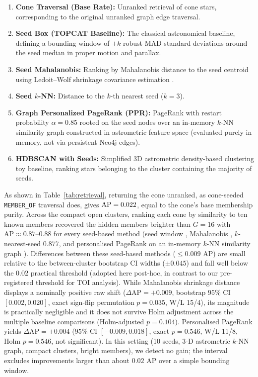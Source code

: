 \documentclass[preprint,12pt,authoryear]{elsarticle}
\begin{document}
\begin{enumerate}
    \item \textbf{Cone Traversal (Base Rate):} Unranked retrieval of cone stars, corresponding to the original unranked graph edge traversal.
    \item \textbf{Seed Box (TOPCAT Baseline):} The classical astronomical baseline, defining a bounding window of $\pm k$ robust MAD standard deviations around the seed median in proper motion and parallax.
    \item \textbf{Seed Mahalanobis:} Ranking by Mahalanobis distance to the seed centroid using Ledoit--Wolf shrinkage covariance estimation \citep{Ledoit2004}.
    \item \textbf{Seed $k$-NN:} Distance to the $k$-th nearest seed ($k=3$).
    \item \textbf{Graph Personalized PageRank (PPR):} PageRank with restart probability $\alpha = 0.85$ rooted on the seed nodes over an in-memory $k$-NN similarity graph constructed in astrometric feature space (evaluated purely in memory, not via persistent Neo4j edges).
    \item \textbf{HDBSCAN with Seeds:} Simplified 3D astrometric density-based clustering toy baseline, ranking stars belonging to the cluster containing the majority of seeds.
\end{enumerate}



As shown in Table~\ref{tab:retrieval}, returning the cone unranked, as cone-seeded \texttt{MEMBER\_OF} traversal does, gives $\text{AP} = 0.022{}$, equal to the cone's base membership purity. Across the \nRetrClusters{} compact open clusters, ranking each cone by similarity to ten known members recovered the hidden members brighter than $G = 16$ with $\text{AP} \approx 0.87$--$0.88$ for every seed-based method (seed window \seedBoxAP{}, Mahalanobis \seedMahalanobisAP{}, $k$-nearest-seed $0.877$, and personalised PageRank on an in-memory $k$-NN similarity graph \graphPPRAP{}). Differences between these seed-based methods ($\le 0.009$ AP) are small relative to the between-cluster bootstrap CI widths ($\pm 0.045$) and fall well below the $0.02$ practical threshold (adopted here post-hoc, in contrast to our pre-registered threshold for TOI analysis). While Mahalanobis shrinkage distance displays a nominally positive raw shift ($\Delta\text{AP} = +0.009$, bootstrap $95\%$ CI $[0.002, 0.020]$, exact sign-flip permutation $p = 0.035$, W/L 15/4), its magnitude is practically negligible and it does not survive Holm adjustment across the multiple baseline comparisons (Holm-adjusted $p = 0.104$). Personalised PageRank yields $\Delta\text{AP} = +0.004$ ($95\%$ CI $[-0.009, 0.018]$, exact $p = 0.546$, W/L 11/8, Holm $p = 0.546$, not significant). In this setting (10 seeds, 3-D astrometric $k$-NN graph, compact clusters, bright members), we detect no gain; the interval excludes improvements larger than about $0.02$ AP over a simple bounding window.
\end{document}
